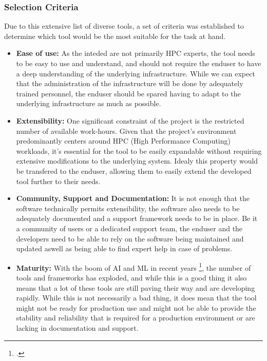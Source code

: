 \subsubsection{Selection Criteria}

Due to this extensive list of diverse tools, a set of criteria was established to determine which tool would be the most suitable for the task at hand.

\begin{itemize}
    \item \textbf{Ease of use:} 
        As the inteded are not primarily \ac{HPC} experts, the tool needs to be easy to use and understand,
        and should not require the enduser to have a deep understanding of the underlying infrastructure.
        While we can expect that the administration of the infrastructure will be done by adequately trained personnel, 
        the enduser should be spared having to adapt to the underlying infrastructure as much as possible.

    \item \textbf{Extensibility:}
        One significant constraint of the project is the restricted number of available work-hours.
        Given that the project's environment predominantly centers around HPC (High Performance Computing) workloads,
        it's essential for the tool to be easily expandable without requiring extensive modifications to the underlying system.
        Idealy this property would be transfered to the enduser, allowing them to easily extend the developed tool further to their needs.

    \item \textbf{Community, Support and  Documentation:}
        It is not enough that the software technically permits extensibility, the software also needs to be adequately documented and a support framework needs to be in place.
        Be it a community of users or a dedicated support team, the enduser and the developers need to be able to rely on the software being maintained and updated aswell as being able to find expert help in case of problems.

    \item \textbf{Maturity:}
        With the boom of \ac{AI} and \ac{ML} in recent years \footcite{24TopAI}, the number of tools and frameworks has exploded, and while this is a good thing it also means that a lot of these tools are still paving their way and are developing rapidly.
        While this is not necessarily a bad thing, it does mean that the tool might not be ready for production use and might not be able to provide the stability and reliability that is required for a production environment or are lacking in documentation and support.      


\end{itemize}
